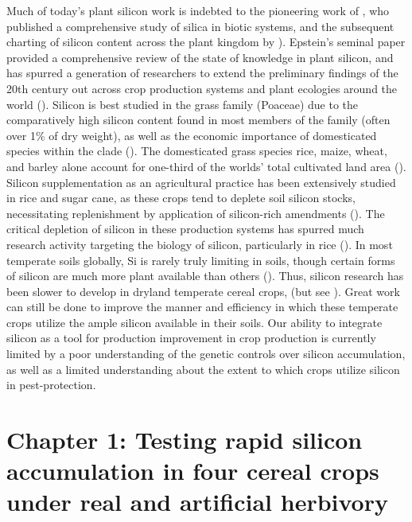 \documentclass[12pt, letterpaper, ]{report}
\begin{document}
Much of today’s plant silicon work is indebted to the pioneering work of \textcite{jones_silica_1967}, who published a comprehensive study of silica in biotic systems, and the subsequent charting of silicon content across the plant kingdom by \textcite{takahashi_possibility_1990}). Epstein’s seminal \citeyear{epstein_silicon_1999} paper provided a comprehensive review of the state of knowledge in plant silicon, and has spurred a generation of researchers to extend the preliminary findings of the 20th century out across crop production systems and plant ecologies around the world (\cite{coskun_controversies_2019,hartley_ecology_2016,cooke_is_2011,christian_breeding_2022,de_tombeur_silicon_2021}). Silicon is best studied in the grass family (Poaceae) due to the comparatively high silicon content found in most members of the family (often over 1\% of dry weight), as well as the economic importance of domesticated species within the clade (\cite{reynolds_silicon_2016}). The domesticated grass species rice, maize, wheat, and barley alone account for one-third of the worlds’ total cultivated land area (\cite{faostat}). Silicon supplementation as an agricultural practice has been extensively studied in rice and sugar cane, as these crops tend to deplete soil silicon stocks, necessitating replenishment by application of silicon-rich amendments (\cite{haynes_contemporary_2014,meena_case_2014}). The critical depletion of silicon in these production systems has spurred much research activity targeting the biology of silicon, particularly in rice (\cite{deren_variable_1992-1,dai_genetic_2005,rodrigues_silicon_2004,ye_priming_2013}). In most temperate soils globally, Si is rarely truly limiting in soils, though certain forms of silicon are much more plant available than others (\cite{fraysse_surface_2009}). Thus, silicon research has been slower to develop in dryland temperate cereal crops, (but see \cite{rains_active_2006,neu_silicon_2017,ahmad_silicon_2016}). Great work can still be done to improve the manner and efficiency in which these temperate crops utilize the ample silicon available in their soils. Our ability to integrate silicon as a tool for production improvement in crop production is currently limited by a poor understanding of the genetic controls over silicon accumulation, as well as a limited understanding about the extent to which crops utilize silicon in pest-protection. 

\printbibliography

\chapter{Chapter 1: Testing rapid silicon accumulation in four cereal crops under real and artificial herbivory}
\end{document}
